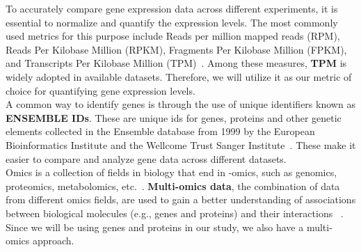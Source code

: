 To accurately compare gene expression data across different experiments, it is essential to normalize and quantify the expression levels.
The most commonly used metrics for this purpose include Reads per million mapped reads (RPM),
Reads Per Kilobase Million (RPKM), Fragments Per Kilobase Million (FPKM),
and Transcripts Per Kilobase Million (TPM)~\cite{cd_geneomics_gene_expression}.
Among these measures, \textbf{TPM} is widely adopted in available datasets.
Therefore, we will utilize it as our metric of choice for quantifying gene expression levels.
\\

A common way to identify genes is through the use of unique identifiers known as \textbf{ENSEMBLE IDs}.
These are unique ids for genes, proteins and other genetic elements collected in the Ensemble database
from 1999 by the European Bioinformatics Institute and the Wellcome Trust Sanger Institute~\cite{ensembl_project}.
These make it easier to compare and analyze gene data across different datasets.
\\

Omics is a collection of fields in biology that end in -omics, such as genomics, proteomics, metabolomics, etc.~\cite{subedi2022omics}.
\textbf{Multi-omics data}, the combination of data from different omics fields,
are used to gain a better understanding of associations between biological molecules (e.g., genes and proteins) and their interactions
~\cite{Subramanian2020MultiomicsDI}.
Since we will be using genes and proteins in our study, we also have a multi-omics approach.
\\